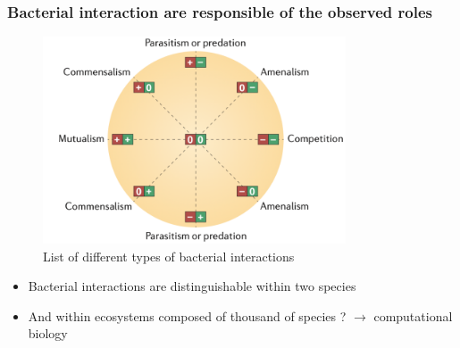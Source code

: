 \documentclass[8pt]{beamer}
\begin{document}
\begin{frame}
\frametitle{Bacterial interaction are responsible of the observed roles}

\begin{figure}
	\centering
	\includegraphics[width=0.8\textwidth]{figures/interaction.png}
    \caption{List of different types of bacterial interactions \tiny \citep{Faust2012} }
\end{figure}
\vspace{-0.5cm}
\begin{block}{}
\begin{itemize}
\item Bacterial interactions are distinguishable within two species
\item And within ecosystems composed of thousand of species ? $\rightarrow$ computational biology 
\end{itemize}
\end{block}

\end{frame}
\end{document}
